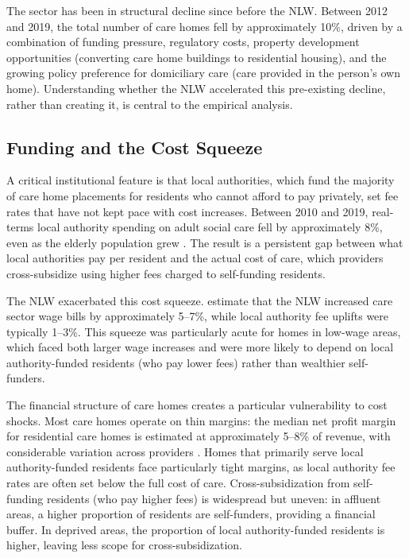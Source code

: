 \documentclass[12pt]{article}
\begin{document}
The sector has been in structural decline since before the NLW. Between 2012 and 2019, the total number of care homes fell by approximately 10\%, driven by a combination of funding pressure, regulatory costs, property development opportunities (converting care home buildings to residential housing), and the growing policy preference for domiciliary care (care provided in the person's own home). Understanding whether the NLW accelerated this pre-existing decline, rather than creating it, is central to the empirical analysis.

\subsection{Funding and the Cost Squeeze}

A critical institutional feature is that local authorities, which fund the majority of care home placements for residents who cannot afford to pay privately, set fee rates that have not kept pace with cost increases. Between 2010 and 2019, real-terms local authority spending on adult social care fell by approximately 8\%, even as the elderly population grew \citep{crawford2021social}. The result is a persistent gap between what local authorities pay per resident and the actual cost of care, which providers cross-subsidize using higher fees charged to self-funding residents.

The NLW exacerbated this cost squeeze. \citet{giupponi2022should} estimate that the NLW increased care sector wage bills by approximately 5--7\%, while local authority fee uplifts were typically 1--3\%. This squeeze was particularly acute for homes in low-wage areas, which faced both larger wage increases and were more likely to depend on local authority-funded residents (who pay lower fees) rather than wealthier self-funders.

The financial structure of care homes creates a particular vulnerability to cost shocks. Most care homes operate on thin margins: the median net profit margin for residential care homes is estimated at approximately 5--8\% of revenue, with considerable variation across providers \citep{laing2020care}. Homes that primarily serve local authority-funded residents face particularly tight margins, as local authority fee rates are often set below the full cost of care. Cross-subsidization from self-funding residents (who pay higher fees) is widespread but uneven: in affluent areas, a higher proportion of residents are self-funders, providing a financial buffer. In deprived areas, the proportion of local authority-funded residents is higher, leaving less scope for cross-subsidization.
\end{document}
